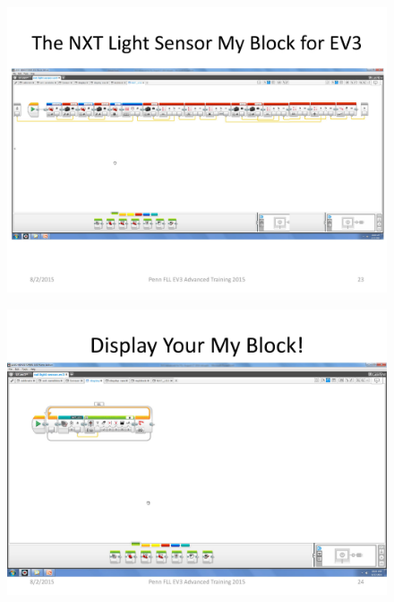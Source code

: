 \documentclass[11pt]{beamer}
\begin{document}
\begin{frame}
\begin{figure}
\includegraphics[scale=0.4]{ev3advanced2015/file-page23}
\end{figure}
\end{frame}

\begin{frame}
\begin{figure}
\includegraphics[scale=0.4]{ev3advanced2015/file-page24}
\end{figure}
\end{frame}
\end{document}
